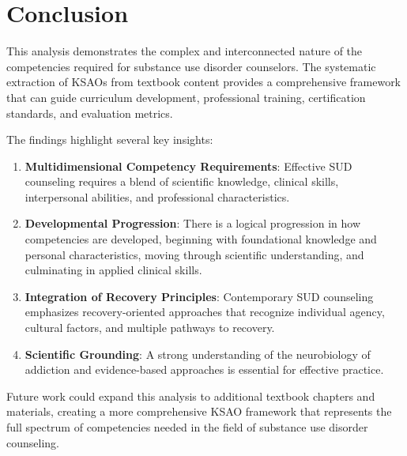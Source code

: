 \documentclass[
  letterpaper,
  DIV=11,
  numbers=noendperiod]{scrartcl}
\begin{document}
\section{Conclusion}\label{conclusion}

This analysis demonstrates the complex and interconnected nature of the
competencies required for substance use disorder counselors. The
systematic extraction of KSAOs from textbook content provides a
comprehensive framework that can guide curriculum development,
professional training, certification standards, and evaluation metrics.

The findings highlight several key insights:

\begin{enumerate}
\def\labelenumi{\arabic{enumi}.}
\item
  \textbf{Multidimensional Competency Requirements}: Effective SUD
  counseling requires a blend of scientific knowledge, clinical skills,
  interpersonal abilities, and professional characteristics.
\item
  \textbf{Developmental Progression}: There is a logical progression in
  how competencies are developed, beginning with foundational knowledge
  and personal characteristics, moving through scientific understanding,
  and culminating in applied clinical skills.
\item
  \textbf{Integration of Recovery Principles}: Contemporary SUD
  counseling emphasizes recovery-oriented approaches that recognize
  individual agency, cultural factors, and multiple pathways to
  recovery.
\item
  \textbf{Scientific Grounding}: A strong understanding of the
  neurobiology of addiction and evidence-based approaches is essential
  for effective practice.
\end{enumerate}

Future work could expand this analysis to additional textbook chapters
and materials, creating a more comprehensive KSAO framework that
represents the full spectrum of competencies needed in the field of
substance use disorder counseling.
\end{document}
